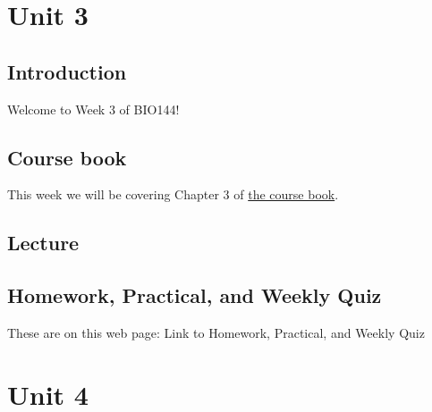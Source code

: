 \documentclass[
  letterpaper,
  8pt,
  a4paper]{book}
\begin{document}

\chapter*{Unit 3}\label{unit-3}


\section*{Introduction}\label{introduction-3}


Welcome to Week 3 of BIO144!

\section*{Course book}\label{course-book-2}


This week we will be covering Chapter 3 of
\href{https://opetchey.github.io/BIO144_Course_Book/}{the course book}.

\section*{Lecture}\label{lecture-2}


\section*{Homework, Practical, and Weekly
Quiz}\label{homework-practical-and-weekly-quiz-2}


These are on this web page: Link to Homework, Practical, and Weekly Quiz


\chapter*{Unit 4}\label{unit-4}

\end{document}
